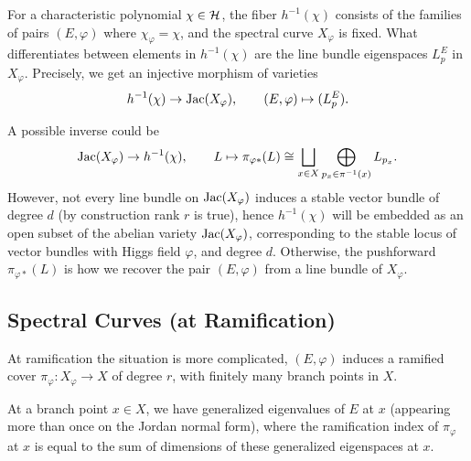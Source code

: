 For a characteristic polynomial $\chi\in\mathcal{H}$, the fiber $h^{-1}(\chi)$ consists of the families of pairs $(E,\varphi)$ where $\chi_\varphi=\chi$, and the spectral curve $X_\varphi$ is fixed. What differentiates between elements in $h^{-1}(\chi)$ are the line bundle eigenspaces $L^E_p$ in $X_\varphi$. Precisely, we get an injective morphism of varieties
\begin{equation}
h^{-1}(\chi)\rightarrow\text{Jac}(X_\varphi),\qquad (E,\varphi)\mapsto (L^E_p).
\end{equation}

A possible inverse could be
\begin{equation}
    \text{Jac}(X_\varphi)\rightarrow h^{-1}(\chi),\qquad L\mapsto\pi_{\varphi*}(L)\cong\bigsqcup_{x\in X}\bigoplus_{p_x\in\pi^{-1}(x)}L_{p_x}.
    \end{equation}
However, not every line bundle on $\text{Jac}(X_\varphi)$ induces a stable vector bundle of degree $d$ (by construction rank $r$ is true), hence $h^{-1}(\chi)$ will be embedded as an open subset of the abelian variety $\text{Jac}(X_\varphi)$, corresponding to the stable locus of vector bundles with Higgs field $\varphi$, and degree $d$. Otherwise, the pushforward $\pi_{\varphi*}(L)$ is how we recover the pair $(E,\varphi)$ from a line bundle of $X_\varphi$.

\subsection{Spectral Curves (at Ramification)}

At ramification the situation is more complicated, $(E,\varphi)$ induces a ramified cover $\pi_\varphi:X_\varphi\rightarrow X$ of degree $r$, with finitely many branch points in $X$.

At a branch point $x\in X$, we have generalized eigenvalues of $E$ at $x$ (appearing more than once on the Jordan normal form), where the ramification index of $\pi_\varphi$ at $x$ is equal to the sum of dimensions of these generalized eigenspaces at $x$.

